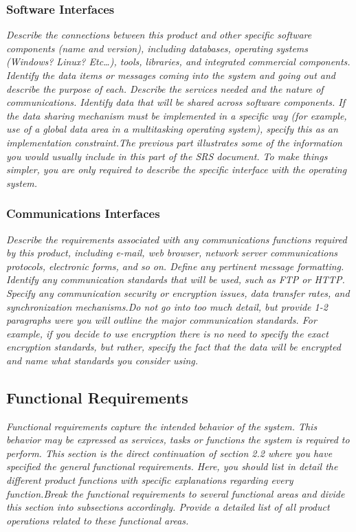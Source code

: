         \subsubsection{Software Interfaces}\label{sec:software-interfaces}
            \emph{Describe the connections between this product and other specific software components (name and version), including databases, operating systems (Windows? Linux? Etc\dots), tools, libraries, and integrated commercial components. Identify the data items or messages coming into the system and going out and describe the purpose of each. Describe the services needed and the nature of communications. Identify data that will be shared across software components. If the data sharing mechanism must be implemented in a specific way (for example, use of a global data area in a multitasking operating system), specify this as an implementation constraint.\gnl The previous part illustrates some of the information you would usually include in this part of the SRS document. To make things simpler, you are only required to describe the specific interface with the operating system.}
        \subsubsection{Communications Interfaces}\label{sec:communications-interfaces}
            \emph{Describe the requirements associated with any communications functions required by this product, including e-mail, web browser, network server communications protocols, electronic forms, and so on. Define any pertinent message formatting. Identify any communication standards that will be used, such as FTP or HTTP. Specify any communication security or encryption issues, data transfer rates, and synchronization mechanisms.\gnl Do not go into too much detail, but provide 1-2 paragraphs were you will outline the major communication standards. For example, if you decide to use encryption there is no need to specify the exact encryption standards, but rather, specify the fact that the data will be encrypted and name what standards you consider using.}
    \subsection{Functional Requirements}\label{sec:functional-requirements}
        \emph{Functional requirements capture the intended behavior of the system. This behavior may be expressed as services, tasks or functions the system is required to perform. This section is the direct continuation of section 2.2 where you have specified the general functional requirements. Here, you should list in detail the different product functions with specific explanations regarding every function.\gnl Break the functional requirements to several functional areas and divide this section into subsections accordingly. Provide a detailed list of all product operations related to these functional areas.}
